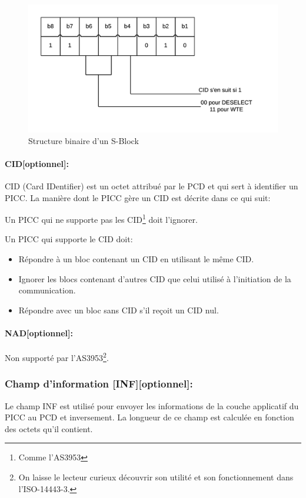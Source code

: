 \documentclass{themeensg}
\begin{document}
\begin{figure}[h!]
\centering
\includegraphics[scale=1]{images/sblock.png}
\caption{Structure binaire d'un S-Block}
\label{fig:S-Block}
\end{figure}
\paragraph{CID[optionnel]:}
CID (Card IDentifier) est un octet attribué par le PCD et qui sert à identifier un PICC. La manière dont le PICC gère un CID est décrite dans ce qui suit:

Un PICC qui ne supporte pas les CID\footnote{Comme l'AS3953} doit l'ignorer.

Un PICC qui supporte le CID doit:
\begin{itemize}
\item Répondre à un bloc contenant un CID en utilisant le même CID.
\item Ignorer les blocs contenant d'autres CID que celui utilisé à l'initiation de la communication.
\item Répondre avec un bloc sans CID s'il reçoit un CID nul.
\end{itemize}

\paragraph{NAD[optionnel]:}

Non supporté par l'AS3953\footnote{On laisse le lecteur curieux découvrir son utilité et son fonctionnement dans l'ISO-14443-3.}.

\subsubsection{Champ d'information [INF][optionnel]:}

Le champ INF est utilisé pour envoyer les informations de la couche applicatif du PICC au PCD et inversement. La longueur de ce champ est calculée  en fonction des octets qu'il contient.
\end{document}
